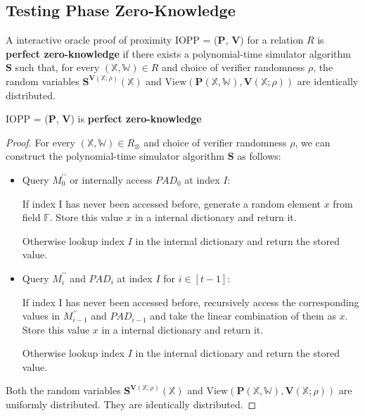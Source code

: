\subsection{Testing Phase Zero-Knowledge}

\begin{definition}

A interactive oracle proof of proximity IOPP = ($\textbf{P}$, $\textbf{V}$) for a relation $R$ is \textbf{perfect zero-knowledge} if there exists a polynomial-time simulator algorithm $\textbf{S}$ such that, for every $(\mathbb{X}, \mathbb{W}) \in R$ and choice of verifier randomness $\rho$, the random variables $\textbf{S}^{\textbf{V}(\mathbb{X};\rho)}(\mathbb{X})$ and $\text{View}(\textbf{P}(\mathbb{X}, \mathbb{W}), \textbf{V}(\mathbb{X};\rho))$ are identically distributed.
 
\end{definition}

\begin{lemma}
\label{lemma:szkpc-zk}

IOPP = ($\textbf{P}$, $\textbf{V}$) is \textbf{perfect zero-knowledge}

\end{lemma}
\begin{proof}

For every $(\mathbb{X}, \mathbb{W}) \in R_\otimes$ and choice of verifier randomness $\rho$, we can construct the polynomial-time simulator algorithm $\textbf{S}$ as follows:

\begin{itemize}
    \item Query $M_0^{\prime\prime}$ or internally access $PAD_0$ at index $I$:
    
    If index I has never been accessed before, generate a random element $x$ from field $\mathbb{F}$. Store this value $x$ in a internal dictionary and return it.
    
    Otherwise lookup index $I$ in the internal dictionary and return the stored value.
    
    \item Query $M_i^{\prime\prime}$ and $PAD_i$ at index $I$ for $i \in [t-1]$:

    If index I has never been accessed before, recursively access the corresponding values in $M_{i-1}^{\prime\prime}$ and $PAD_{i-1}$ and take the linear combination of them as $x$.
    Store this value $x$ in a internal dictionary and return it.
    
    Otherwise lookup index $I$ in the internal dictionary and return the stored value.    
    
\end{itemize}

Both the random variables $\textbf{S}^{\textbf{V}(\mathbb{X};\rho)}(\mathbb{X})$ and $\text{View}(\textbf{P}(\mathbb{X}, \mathbb{W}), \textbf{V}(\mathbb{X};\rho))$ are uniformly distributed. They are identically distributed.

\end{proof}